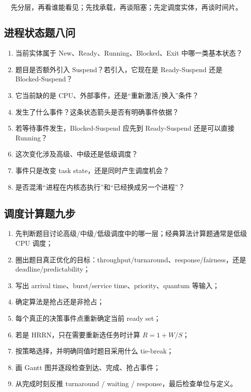 \documentclass[11pt,a4paper]{ctexart}
\begin{document}
\begin{exam}[线程题的最短定性口诀]
\[
\boxed{\text{先分层，再看谁能看见；先找承载，再谈阻塞；先定调度实体，再谈时间片。}}
\]
\end{exam}

\subsection{进程状态题八问}
\begin{enumerate}
\item 当前实体属于 New、Ready、Running、Blocked、Exit 中哪一类基本状态？
\item 题目是否额外引入 Suspend？若引入，它现在是 Ready-Suspend 还是 Blocked-Suspend？
\item 它当前缺的是 CPU、外部事件，还是“重新激活/换入”条件？
\item 发生了什么事件？这条状态箭头是否有明确事件依据？
\item 若等待事件发生，Blocked-Suspend 应先到 Ready-Suspend 还是可以直接 Running？
\item 这次变化涉及高级、中级还是低级调度？
\item 事件只是改变 task state，还是同时产生调度机会？
\item 是否混淆“进程在内核态执行”和“已经换成另一个进程”？
\end{enumerate}

\subsection{调度计算题九步}
\begin{enumerate}
\item 先判断题目讨论高级/中级/低级调度中的哪一层；经典算法计算题通常是低级 CPU 调度；
\item 圈出题目真正优化的目标：throughput/turnaround、response/fairness，还是 deadline/predictability；
\item 写出 arrival time、burst/service time、priority、quantum 等输入；
\item 确定算法是抢占还是非抢占；
\item 每个真正的决策事件点重新确定当前 ready set；
\item 若是 HRRN，只在需要重新选任务时计算 $R=1+W/S$；
\item 按策略选择，并明确同值时题目采用什么 tie-break；
\item 画 Gantt 图并逐段检查到达、完成、抢占事件；
\item 从完成时刻反推 turnaround / waiting / response，最后检查单位与定义。
\end{enumerate}
\end{document}
